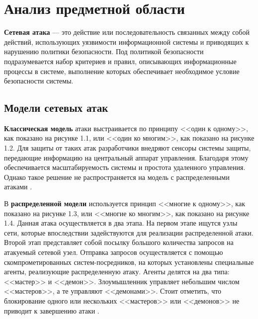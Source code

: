 \chapter{Анализ предметной области}

\textbf{Сетевая атака} \cite{second} --- это действие или последовательность связанных между собой действий, использующих уязвимости информационной системы и приводящих к нарушению политики безопасности. Под политикой безопасности подразумевается набор критериев и правил, описывающих информационные процессы в системе, выполнение которых обеспечивает необходимое условие безопасности системы.

\section{Модели сетевых атак}

\textbf{Классическая модель} атаки выстраивается по принципу  <<один к одному>>, как показано на рисунке 1.1, или <<один ко многим>>, как показано на рисунке 1.2. Для защиты от таких атак разработчики внедряют сенсоры системы защиты, передающие информацию на центральный аппарат управления.
Благодаря этому обеспечивается масштабируемость системы и простота удаленного управления. Однако такое решение не распространяется на модель с распределенными атаками \cite{third}.

\clearpage
{}


В \textbf{распределенной модели} используется принцип <<многие к одному>>, как показано на рисунке 1.3, или <<многие ко многим>>, как показано на рисунке 1.4. Данная атака осуществляется в два этапа. На первом этапе ищутся узлы сети, которые впоследствии задействуются для реализации распределенной атаки. Второй этап представляет собой посылку большого количества запросов на атакуемый сетевой узел.
Отправка запросов осу­ществляется с помощью скомпроме­тированных систем-посредников, на которых установлены специальные агенты, реализующие распределенную атаку. Агенты делятся на два типа: <<мастер>> и <<демон>>. Злоумышленник управляет небольшим числом <<мастеров>>, а те управляют <<демонами>>.
Стоит отметить, что блокирование одного или нескольких <<мастеров>> или <<демонов>> не приводит к завершению атаки \cite{third}.

\clearpage


